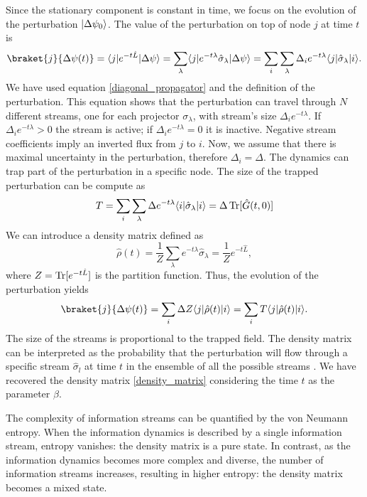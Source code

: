 Since the stationary component is constant in time, we focus on the evolution of the perturbation $\lvert\Delta\psi_0\rangle$. 
The value of the perturbation on top of node $j$ at time $t$ is
\begin{equation}
    \braket{j}{\Delta\psi(t)} = \bra{j} e^{-t\hat L} \ket{\Delta\psi} =\sum_\lambda \bra{j} e^{-t\lambda} \hat \sigma_\lambda\ket{\Delta\psi} = \sum_i  \sum_\lambda \Delta_i e^{-t\lambda} \bra{j}  \hat \sigma_\lambda \ket{i}.
\end{equation}
We have used equation \eqref{diagonal_propagator} and the definition of the perturbation.
This equation shows that the perturbation can travel through $N$ different streams, one for each projector $\sigma_\lambda$, with stream's size $\Delta_i e^{-t\lambda}$. If $\Delta_i e^{-t\lambda} > 0$ the stream is active; if $\Delta_i e^{-t\lambda} = 0$ it is inactive. Negative stream coefficients imply an inverted flux from $j$ to $i$.
Now, we assume that there is maximal uncertainty in the perturbation, therefore $\Delta_i = \Delta$.
The dynamics can trap part of the perturbation in a specific node. The size of the trapped perturbation can be compute as
\begin{equation}\label{T_equation}
    T = \sum_i  \sum_\lambda \Delta e^{-t\lambda} \langle i\rvert  \hat \sigma_\lambda \lvert i\rangle = \Delta \operatorname{Tr} [\hat G(t,0)]
\end{equation} 
We can introduce a density matrix defined as
\begin{equation}
    \hat\rho(t) = \frac{1}{Z}\sum_\lambda  e^{-t\lambda} \hat \sigma_\lambda = \frac{1}{Z} e^{-t\hat L},
\end{equation}
where $Z = \operatorname{Tr}[e^{-t\hat L}] $ is the partition function.
Thus, the evolution of the perturbation yields
\begin{equation}
    \braket{j}{\Delta\psi(t)} = \sum_i \Delta Z \bra{j}\hat\rho(t) \ket{i} = \sum_i T\bra{j}\hat\rho(t) \ket{i}.
\end{equation}
The size of the streams is proportional to the trapped field.
The density matrix can be interpreted as the probability that the perturbation will flow through a specific stream $\hat \sigma_l$ at time $t$ in the ensemble of all the possible streams \cite{De_Domenico_2020}. We have recovered the density matrix \eqref{density_matrix} considering the time $t$ as the parameter $\beta$.

The complexity of information streams can be quantified by the von Neumann entropy.
When the information dynamics is described by a single information stream, entropy vanishes: the density matrix is a pure state.
In contrast, as the information dynamics becomes more complex and diverse, the number of information streams increases, resulting in higher entropy: the density matrix becomes a mixed state.


